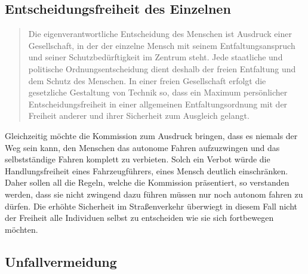 \documentclass[twoside,a4paper,12pt]{article}
\begin{document}
\subsection{Entscheidungsfreiheit des Einzelnen} \label{EntscheidungsfreiheitDesEinzelnen}

\begin{quote}
\glqq
Die eigenverantwortliche Entscheidung des Menschen ist Ausdruck einer Gesellschaft, in
der der einzelne Mensch mit seinem Entfaltungsanspruch und seiner Schutzbedürftigkeit
im Zentrum steht. Jede staatliche und politische Ordnungsentscheidung dient deshalb
der freien Entfaltung und dem Schutz des Menschen. In einer freien Gesellschaft erfolgt
die gesetzliche Gestaltung von Technik so, dass ein Maximum persönlicher Entscheidungsfreiheit in einer allgemeinen 
Entfaltungsordnung mit der Freiheit anderer und ihrer
Sicherheit zum Ausgleich gelangt.\grqq\mbox{~\cite[S. 10]{ek}}
\end{quote}
Gleichzeitig möchte die Kommission zum Ausdruck bringen, dass es niemals der Weg sein kann, den Menschen das autonome Fahren aufzuzwingen und das selbstständige Fahren komplett zu verbieten. Solch ein Verbot würde die Handlungsfreiheit eines Fahrzeugführers, eines Mensch deutlich einschränken. Daher sollen all die Regeln, welche die Kommission präsentiert, so verstanden werden, dass sie nicht zwingend dazu führen müssen nur noch autonom fahren zu dürfen. Die erhöhte Sicherheit im Straßenverkehr überwiegt in diesem Fall nicht der Freiheit alle Individuen selbst zu entscheiden wie sie sich fortbewegen möchten.

\subsection{Unfallvermeidung} \label{Unfallvermeidung}
\end{document}
